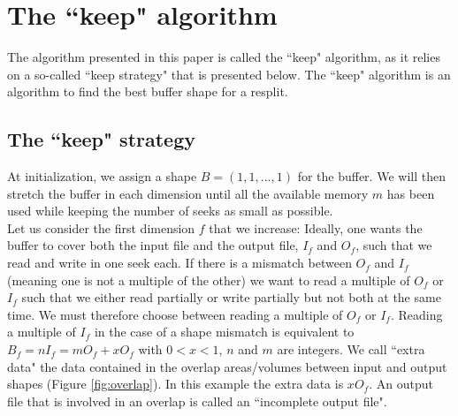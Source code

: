 \documentclass[conference]{IEEEtran}
\begin{document}
\section{The ``keep" algorithm}
The algorithm presented in this paper is called the ``keep" algorithm, as it relies on a so-called ``keep strategy" that is presented below.
The ``keep" algorithm is an algorithm to find the best buffer shape for a resplit.

\subsection{The ``keep" strategy}
At initialization, we assign a shape $B = (1, 1,..., 1)$ for the buffer.
We will then stretch the buffer in each dimension until all the available memory $m$ has been used while keeping the number of seeks as small as possible. \\

Let us consider the first dimension $f$ that we increase: Ideally, one wants the buffer to cover both the input file and the output file, $I_f$ and $O_f$, such that we read and write in one seek each.
If there is a mismatch between $O_f$ and $I_f$ (meaning one is not a multiple of the other) we want to read a multiple of $O_f$ or $I_f$ such that we either read partially or write partially but not both at the same time.
We must therefore choose between reading a multiple of $O_f$ or $I_f$.
Reading a multiple of $I_f$ in the case of a shape mismatch is equivalent to $B_f = nI_f = mO_f+xO_f$ with $0<x<1$, $n$ and $m$ are integers.
We call ``extra data" the data contained in the overlap areas/volumes between input and output shapes (Figure \ref{fig:overlap}).
In this example the extra data is $xO_f$.
An output file that is involved in an overlap is called an ``incomplete output file". \\
\end{document}
